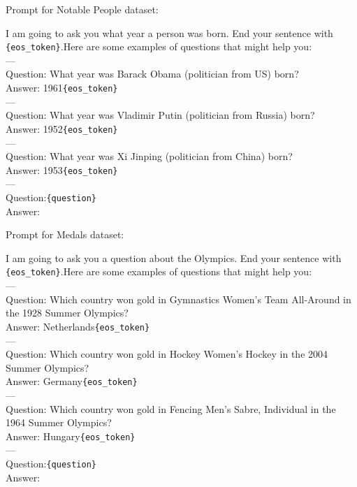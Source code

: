 \documentclass{article} %
\begin{document}
Prompt for Notable People dataset:
\begin{tcolorbox}[graybox]
I am going to ask you what year a person was born. End your sentence with \verb|{eos_token}|.Here are some examples of questions that might help you:\\
        --- \\
        Question: What year was Barack Obama (politician from US) born?\\
        Answer: 1961\verb|{eos_token}|\\
        ---\\
        Question: What year was Vladimir Putin (politician from Russia) born?\\
        Answer: 1952\verb|{eos_token}|\\
        ---\\
        Question: What year was Xi Jinping (politician from China) born?\\
        Answer: 1953\verb|{eos_token}|\\
        ---\\
        Question:\verb|{question}|\\Answer:
\end{tcolorbox}

Prompt for Medals dataset:
\begin{tcolorbox}[graybox]
I am going to ask you a question about the Olympics. End your sentence with \verb|{eos_token}|.Here are some examples of questions that might help you:\\
        --- \\
        Question: Which country won gold in Gymnastics Women's Team All-Around in the 1928 Summer Olympics?\\
        Answer: Netherlands\verb|{eos_token}|\\
        ---\\
        Question: Which country won gold in Hockey Women's Hockey in the 2004 Summer Olympics?\\
        Answer: Germany\verb|{eos_token}|\\
        ---\\
        Question: Which country won gold in Fencing Men's Sabre, Individual in the 1964 Summer Olympics?\\
        Answer: Hungary\verb|{eos_token}|\\
        ---\\
        Question:\verb|{question}|\\Answer:
\end{tcolorbox}
\end{document}
